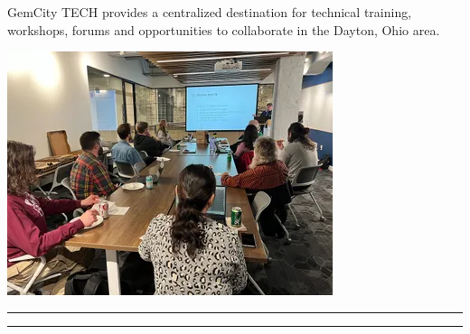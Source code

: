 \documentclass[14pt]{extarticle}
\begin{document}
\begin{multicols}{3}
GemCity TECH provides a centralized destination for technical training,
workshops, forums and opportunities to collaborate in the Dayton, Ohio
area.

\includegraphics{img/meetup_image.jpg}

\hrule

\hrule





\end{multicols}
\end{document}
